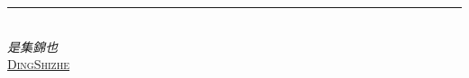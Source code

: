 
\newcommand*{\plogo}{\FiveFlowerOpen}

\newcommand{\Author}{\href{https://github.com/DingShizhe}{DingShizhe}}
\newcommand\myquotepage[3]{\thispagestyle{empty}\vspace*{\fill}\vspace*{\fill}\textcolor{#1}{\textit{#2\\\rightline{#3}}}\vspace*{\fill}\vspace*{\fill}\vspace*{\fill}}

\begin{titlepage}
	\raggedleft
	\rule{1pt}{\textheight} %
	\hspace{0.06\textwidth}
	\parbox[b]{0.80\textwidth}{
		{
            {\fontsize{40}{50}\selectfont
            }
        }\\[2\baselineskip] %
		\textcolor{by}{\large\textit{是集錦也}}\\[4\baselineskip]{\large\textsc{\Author}}
        
		\vspace{0.5\textheight}
		\color{Sienna}{\noindent 且慢~\plogo}\\[\baselineskip]
	}
    
\end{titlepage}